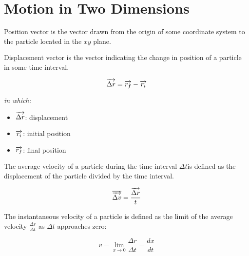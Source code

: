 \chapter{Motion in Two Dimensions}
                \par Position vector is the vector drawn from the origin of some
                coordinate system to the particle located in the $xy$ plane.

                \par Displacement vector is the vector indicating the change in position
                of a particle in some time interval.
                \begin{center}
                    \begin{equation}
                        \overrightarrow{\Delta r} = \overrightarrow{r_{f}} - \overrightarrow{r_{i}}
                    \end{equation}
                \end{center}
                \textit{in which:}
                \begin{itemize}
                    \item $\overrightarrow{\Delta r}$: displacement
                    \item $\overrightarrow{r_{i}}$: initial position
                    \item $\overrightarrow{r_{f}}$: final position
                \end{itemize}
        \hiiEND

                The average velocity of a particle during the time interval $\Delta t$is 
                defined as the displacement of the particle divided by the time interval.
                \begin{center}
                    \begin{equation}
                        \overline{\overrightarrow{\Delta v}} = \frac{\overrightarrow{\Delta r}}{t}
                    \end{equation}
                \end{center}

                The instantaneous velocity of a particle is defined as the limit of the
                average velocity $\frac{\Delta r}{\Delta t}$ as $\Delta t$ approaches zero:
                \begin{center}
                    \begin{equation}
                        v = \lim_{x \to 0} \frac{\Delta r}{\Delta t} = \frac{dx}{dt}
                    \end{equation}
                \end{center}
        \hiiEND

